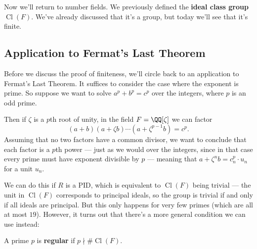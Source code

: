
Now we'll return to number fields. We previously defined the \textbf{ideal class group} $\operatorname{Cl}(F)$. We've already discussed that it's a group, but today we'll see that it's finite. 



\subsection{Application to Fermat's Last Theorem}

Before we discuss the proof of finiteness, we'll circle back to an application to Fermat's Last Theorem. It suffices to consider the case where the exponent is prime. So suppose we want to solve $a^p + b^p = c^p$ over the integers, where $p$ is an odd prime. 

Then if $\zeta$ is a $p$th root of unity, in the field $F = \QQ[\zeta]$ we can factor \[(a + b)(a + \zeta b)\cdots (a + \zeta^{p - 1}b) = c^p.\] Assuming that no two factors have a common divisor, we want to conclude that each factor is a $p$th power --- just as we would over the integers, since in that case every prime must have exponent divisible by $p$ --- meaning that $a + \zeta^nb = c_n^p \cdot u_n$ for a unit $u_n$. 

We can do this if $R$ is a PID, which is equivalent to $\operatorname{Cl}(F)$ being trivial --- the unit in $\operatorname{Cl}(F)$ corresponds to principal ideals, so the group is trivial if and only if all ideals are principal. But this only happens for very few primes (which are all at most $19$). However, it turns out that there's a more general condition we can use instead:

\begin{definition}
    A prime $p$ is \textbf{regular} if $p \nmid \#\operatorname{Cl}(F)$. 
\end{definition}

